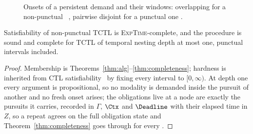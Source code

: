 \begin{figure}[b]
\centering
{}
\caption{Onsets of a persistent demand and their windows: overlapping for a
non-punctual \kI\ , pairwise disjoint for a punctual one
.}
\label{fig:punctual_vs_nonpunctual}%
\label{fig:non_punctual}%
\label{fig:punctual}
\end{figure}

\begin{corollary}\label{cor:depthone}
Satisfiability of non-punctual TCTL is \textsc{ExpTime}-complete, and the procedure is sound and
complete for TCTL of temporal nesting depth at most one, punctual intervals included.
\end{corollary}
\begin{proof}
Membership is Theorems~\ref{thm:alg}--\ref{thm:completeness}; hardness is inherited from CTL
satisfiability~\cite{Clarke99} by fixing every interval to $[0,\infty)$. At depth one every argument
is propositional, so no modality is demanded inside the pursuit of another and no fresh onset arises;
the obligations live at a node are exactly the pursuits it carries, recorded in $\Gamma$, $\Ctx$ and
$\Deadline$ with their elapsed time in $Z$, so a repeat agrees on the full obligation state and
Theorem~\ref{thm:completeness} goes through for every \kI.
\end{proof}

